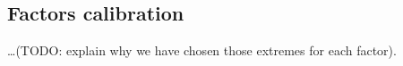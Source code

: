 \subsection{Factors calibration}\label{subsec:calibration}

\ldots (TODO: explain why we have chosen those extremes for each factor).
